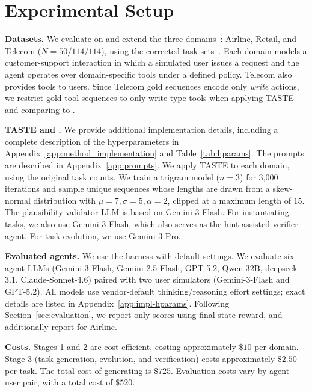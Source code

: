

\section{Experimental Setup}
\label{sec:experiments_setup}

\noindent\textbf{Datasets.} We evaluate on and extend the three \taubench domains~\citep{tau2barres}: Airline, Retail, and Telecom ($N\!=\!50/114/114$), using the \taubenchverified corrected task sets~\citep{saber2025cuadron}. Each domain models a customer-support interaction in which a simulated user issues a request and the agent operates over domain-specific tools under a defined policy. Telecom also provides tools to users. Since Telecom gold sequences encode only \emph{write} actions, we restrict gold tool sequences to only write-type tools when applying TASTE and comparing \ourbenchmark to \taubench.

\smallskip\noindent\textbf{TASTE and \ourbenchmark.}
We provide additional implementation details, including a complete description of the hyperparameters in Appendix~\ref{app:method_implementation} and Table~\ref{tab:hparams}. The prompts are described in Appendix~\ref{app:prompts}.
We apply TASTE to each domain, using the original task counts. We train a trigram model ($n\!=\!3$) for 3,000 iterations and sample unique sequences whose lengths are drawn from a skew-normal distribution with $\mu\!=\!7, \sigma\!=\!5, \alpha\!=\!2$, clipped at a maximum length of $15$. The plausibility validator LLM is based on Gemini-3-Flash. For instantiating tasks, we also use  Gemini-3-Flash, which also serves as the hint-assisted verifier agent. For task evolution, we use Gemini-3-Pro.

\smallskip\noindent\textbf{Evaluated agents.}
We use the \taubench harness with default settings. We evaluate six agent LLMs (Gemini-3-Flash, Gemini-2.5-Flash, GPT-5.2, Qwen-32B, deepseek-3.1, Claude-Sonnet-4.6) paired with two user simulators (Gemini-3-Flash and GPT-5.2). All models use vendor-default thinking/reasoning effort settings; exact details are listed in Appendix~\ref{app:impl-hparams}. Following Section~\ref{sec:evaluation}, we report only \passone scores using final-state reward, and additionally report \passthree for Airline.

\smallskip\noindent\textbf{Costs.} Stages 1 and 2 are cost-efficient, costing approximately $\$10$ per domain. Stage 3 (task generation, evolution, and verification) costs approximately $\$2.50$ per task. The total cost of generating \ourbenchmark is $\$725$. Evaluation costs vary by agent--user pair, with a total cost of $\$520$.